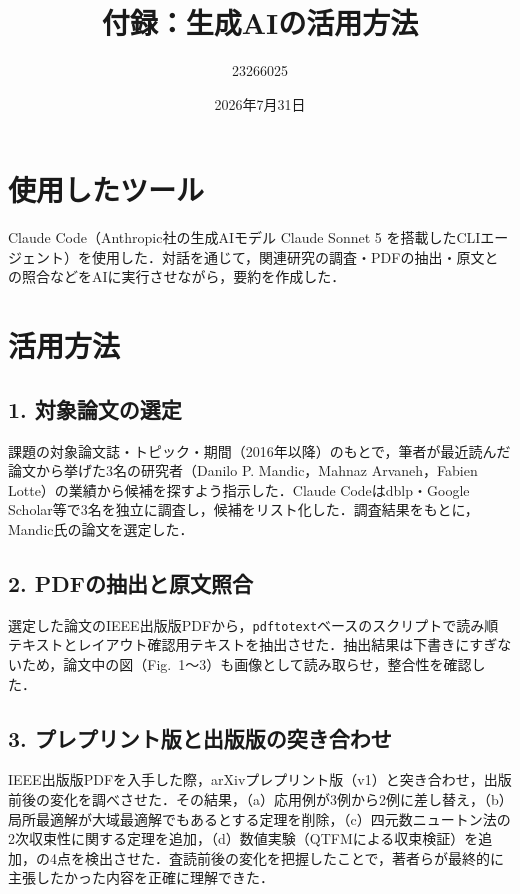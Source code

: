 \documentclass[twocolumn, 10pt]{jsarticle}
\title{付録：生成AIの活用方法}
\author{23266025}
\date{2026年7月31日}
\begin{document}
\maketitle

\section*{使用したツール}

Claude Code（Anthropic社の生成AIモデル Claude Sonnet 5 を搭載したCLIエージェント）を使用した．対話を通じて，関連研究の調査・PDFの抽出・原文との照合などをAIに実行させながら，要約を作成した．

\section*{活用方法}

\subsection*{1. 対象論文の選定}

課題の対象論文誌・トピック・期間（2016年以降）のもとで，筆者が最近読んだ論文から挙げた3名の研究者（Danilo P. Mandic，Mahnaz Arvaneh，Fabien Lotte）の業績から候補を探すよう指示した．Claude Codeはdblp・Google Scholar等で3名を独立に調査し，候補をリスト化した．調査結果をもとに，Mandic氏の論文を選定した．

\subsection*{2. PDFの抽出と原文照合}

選定した論文のIEEE出版版PDFから，\texttt{pdftotext}ベースのスクリプトで読み順テキストとレイアウト確認用テキストを抽出させた．抽出結果は下書きにすぎないため，論文中の図（Fig.\ 1〜3）も画像として読み取らせ，整合性を確認した．

\subsection*{3. プレプリント版と出版版の突き合わせ}

IEEE出版版PDFを入手した際，arXivプレプリント版（v1）と突き合わせ，出版前後の変化を調べさせた．その結果，（a）応用例が3例から2例に差し替え，（b）局所最適解が大域最適解でもあるとする定理を削除，（c）四元数ニュートン法の2次収束性に関する定理を追加，（d）数値実験（QTFMによる収束検証）を追加，の4点を検出させた．査読前後の変化を把握したことで，著者らが最終的に主張したかった内容を正確に理解できた．
\end{document}
